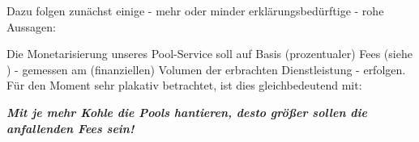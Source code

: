 \vspace{0.2cm}

Dazu folgen zunächst einige - mehr oder minder erklärungsbedürftige - rohe Aussagen: 

\vspace{0.2cm} 

\begin{Praemisse}[Monetarisierung]

Die Monetarisierung unseres Pool-Service soll auf Basis (prozentualer) Fees (siehe ) - gemessen am (finanziellen) Volumen der erbrachten Dienst\-leistung - erfolgen. Für den Moment sehr plakativ betrachtet, ist dies gleichbedeutend mit: 

\vspace{0.2cm} 

\textbf{\textit{Mit je mehr Kohle die Pools hantieren, desto größer sollen die anfallenden Fees sein!}}

\end{Praemisse}

\vspace{0.5cm}

